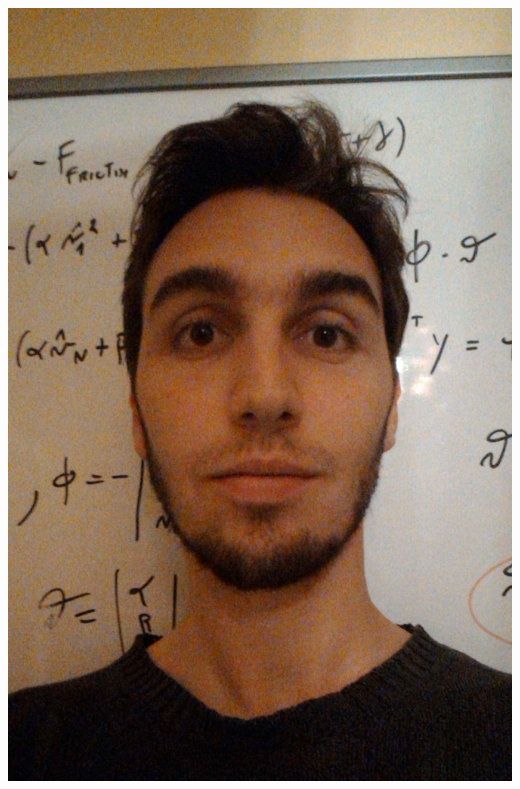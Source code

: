 \documentclass[a4paper,10pt]{article}
\begin{document}
	\begin{minipage}[c]{.25\textwidth}
		\begin{flushright}
			\includegraphics[width=.70\textwidth]{GiacomoAmante_lowres}
		\end{flushright}
	\end{minipage}

	\vspace{-5mm}
\end{document}
